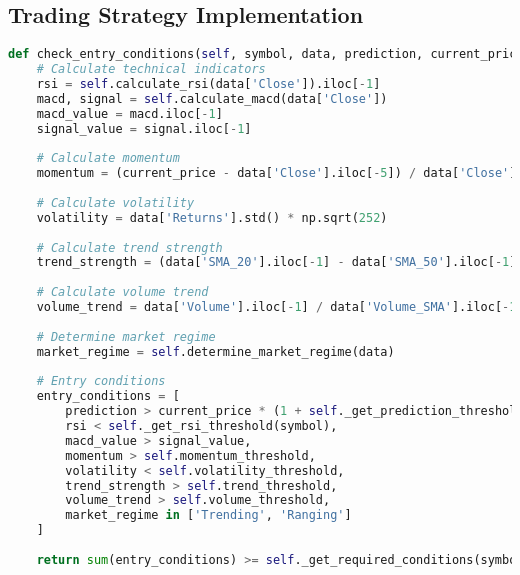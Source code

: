\documentclass[conference]{IEEEtran}
\begin{document}
\subsection{Trading Strategy Implementation}
\begin{lstlisting}[language=Python]
def check_entry_conditions(self, symbol, data, prediction, current_price):
    # Calculate technical indicators
    rsi = self.calculate_rsi(data['Close']).iloc[-1]
    macd, signal = self.calculate_macd(data['Close'])
    macd_value = macd.iloc[-1]
    signal_value = signal.iloc[-1]
    
    # Calculate momentum
    momentum = (current_price - data['Close'].iloc[-5]) / data['Close'].iloc[-5]
    
    # Calculate volatility
    volatility = data['Returns'].std() * np.sqrt(252)
    
    # Calculate trend strength
    trend_strength = (data['SMA_20'].iloc[-1] - data['SMA_50'].iloc[-1]) / data['SMA_50'].iloc[-1]
    
    # Calculate volume trend
    volume_trend = data['Volume'].iloc[-1] / data['Volume_SMA'].iloc[-1]
    
    # Determine market regime
    market_regime = self.determine_market_regime(data)
    
    # Entry conditions
    entry_conditions = [
        prediction > current_price * (1 + self._get_prediction_threshold(symbol)),
        rsi < self._get_rsi_threshold(symbol),
        macd_value > signal_value,
        momentum > self.momentum_threshold,
        volatility < self.volatility_threshold,
        trend_strength > self.trend_threshold,
        volume_trend > self.volume_threshold,
        market_regime in ['Trending', 'Ranging']
    ]
    
    return sum(entry_conditions) >= self._get_required_conditions(symbol)
\end{lstlisting}
\end{document}
